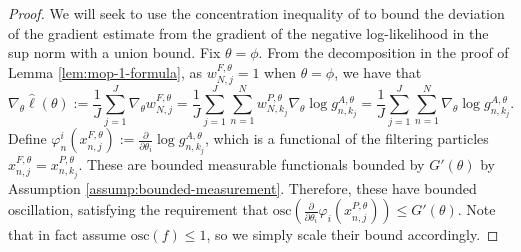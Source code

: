\begin{proof}


We will seek to use the concentration inequality of \cite{delMoral11} to bound the deviation of the gradient estimate from the gradient of the negative log-likelihood in the sup norm with a union bound. Fix $\theta = \phi$.
From the decomposition in the proof of Lemma \ref{lem:mop-1-formula}, as $w_{N, j}^{F, \theta}=1$ when $\theta=\phi$, we have that
\begin{equation}
\nabla_\theta \hat{\ell}(\theta):=\frac{1}{J} \sum_{j=1}^J \nabla_\theta w_{N, j}^{F, \theta}=\frac{1}{J} \sum_{j=1}^J\sum_{n=1}^N  w_{N, k_j}^{P, \theta} \nabla_\theta \log g_{n,k_j}^{A,\theta} = \frac{1}{J} \sum_{j=1}^J\sum_{n=1}^N \nabla_\theta \log g_{n,k_j}^{A,\theta}.
\end{equation}
Define $\varphi_n^i(x_{n,j}^{F,\theta}) := \frac{\partial}{\partial\theta_i} \log g_{n,k_j}^{A,\theta}$, which is a functional of the filtering particles $x_{n,j}^{F,\theta} = x_{n,k_j}^{P,\theta}$. These are bounded measurable functionals bounded by $G'(\theta)$ by Assumption \ref{assump:bounded-measurement}. Therefore, these have bounded oscillation, satisfying the requirement that $\text{osc} \left(\frac{\partial}{\partial\theta_i} \varphi_i(x_{n,j}^{P,\theta}) \right) \leq G'(\theta)$. Note that \cite{delMoral11} in fact assume $\text{osc}(f) \leq 1$, so we simply scale their bound accordingly.


\end{proof}
